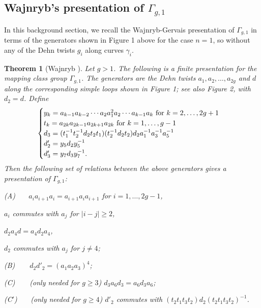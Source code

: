 \documentclass[a4paper,10pt,reqno]{amsart}
\newcommand\Gone{\Gamma_{g,1}}
\newtheorem{thm}{Theorem}[section]
\begin{document}
\subsection{Wajnryb's presentation of $\Gone$}

In this background section, we recall the Wajnryb-Gervais presentation of 
$\Gamma_{g,1}$ in terms of the generators shown in Figure 1 above for the 
case $n=1$, so without any of the Dehn twists $g_i$ along curves $\gamma_i$.

\begin{thm}[Wajnryb \cite{W}] 
\label{wajnryb}
Let $g>1$. The following is a finite presentation for the mapping class group 
$\Gone$. The generators are the Dehn twists $a_1,a_2,\ldots,a_{2g}$ and $d$ 
along the corresponding simple loops shown in Figure 1;
see also Figure 2, with $d_2=d$. Define
\begin{equation}\label{wajnrybdefs}
\begin{cases}
y_k=a_{k-1}a_{k-2}\cdots a_2a_1^2a_2\cdots a_{k-1}a_k\hbox{ for }k=2,\ldots,2g+1\\
t_k=a_{2k}a_{2k-1}a_{2k+1}a_{2k}\hbox{ for }k=1,\ldots,g-1\\
d_3=(t_1^{-1}t_2^{-1}d_2t_2t_1)(t_2^{-1}d_2t_2)d_2a_1^{-1}a_3^{-1}a_5^{-1}\\
d'_2=y_5d_2y_5^{-1}\\
d'_3=y_7d_3y_7^{-1}.
\end{cases}
\end{equation}
Then the following set of relations between the above generators gives a presentation of $\Gone$:

\vspace{.1cm}\noindent
\rm{(A)} \ \ \ $a_ia_{i+1}a_i=a_{i+1}a_ia_{i+1}$ for $i=1,\ldots,2g-1$,

\vspace{.1cm}
\qquad $a_i$ commutes with $a_j$ for $|i-j|\ge 2$,

\vspace{.1cm}
\qquad $d_2a_4d=a_4d_2a_4$,

\vspace{.1cm}
\qquad $d_2$ commutes with $a_j$ for $j\ne 4$;

\vspace{.1cm}\noindent
\rm{(B)}  \ \ \ $\,d_2d'_2=(a_1a_2a_3)^4$; 

\vspace{.1cm}\noindent
\rm{(C)} \ \ \ $\,$(only needed for $g\ge 3$) $d_3a_6d_3=a_6d_3a_6$;

\vspace{.1cm}\noindent
\rm{(C$'$)} \ \ \  (only needed for $g\ge 4$) $d'_2$ commutes with $(t_2t_1t_3t_2)d_2(t_2t_1t_3t_2)^{-1}$. 

\end{thm}
\end{document}
